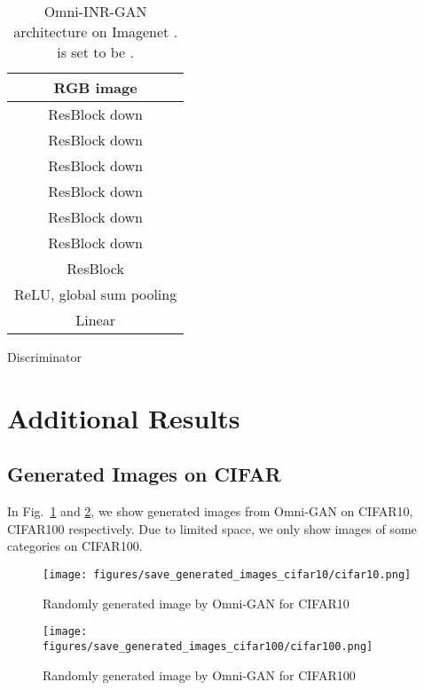 \documentclass[paper_2425.tex]{subfiles}
\begin{document}
\begin{table*}[htbp]
\begin{subtable}[t]{0.48\linewidth}
{\begin{tabular}{c}
        RGB image  \\ \midrule
        ResBlock down                          \\ \midrule
        ResBlock down                        \\ \midrule
        ResBlock down                       \\ \midrule
        ResBlock down                       \\ \midrule
        ResBlock down                       \\ \midrule
        ResBlock down                      \\ \midrule
        ResBlock                          \\ \midrule
        ReLU, global sum pooling                                 \\ \midrule
        Linear                                 \\
        \bottomrule
      \end{tabular}}
    \caption{Discriminator}
  \end{subtable}
  \caption{Omni-INR-GAN architecture on Imagenet .  is set to be .}
  \label{apx:tab:omniinrgan_imagenet256}
\end{table*}





\section{Additional Results}

\subsection{Generated Images on CIFAR}

In Fig.~\ref{apx:fig:cifar10} and \ref{apx:fig:cifar100}, we show generated images from Omni-GAN on CIFAR10, CIFAR100 respectively. Due to limited space, we only show images of some categories on CIFAR100.

\begin{figure}[t]
  \centering
\texttt{[image: figures/save\_generated\_images\_cifar10/cifar10.png]}
\caption{Randomly generated image by Omni-GAN for CIFAR10}
  \label{apx:fig:cifar10}
\end{figure}

\begin{figure}[t]
  \centering
\texttt{[image: figures/save\_generated\_images\_cifar100/cifar100.png]}
\caption{Randomly generated image by Omni-GAN for CIFAR100}
  \label{apx:fig:cifar100}
\end{figure}
\end{document}
